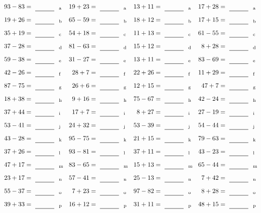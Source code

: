 \documentclass
[
  draft    = true,
  fontsize = 11pt,
  parskip  = half-
]
{scrartcl}
\begin{document}
\clearpage
\begin{align*}
    \pline{93-83}&=\rline{a}
  & \pline{19+23}&=\rline{a}
  & \pline{13+11}&=\rline{a}
  & \pline{17+28}&=\rline{a} \\[1ex]
    \pline{19+26}&=\rline{b}
  & \pline{65-59}&=\rline{b}
  & \pline{18+12}&=\rline{b}
  & \pline{17+15}&=\rline{b} \\[1ex]
    \pline{35+19}&=\rline{c}
  & \pline{54+18}&=\rline{c}
  & \pline{11+13}&=\rline{c}
  & \pline{61-55}&=\rline{c} \\[1ex]
    \pline{37-28}&=\rline{d}
  & \pline{81-63}&=\rline{d}
  & \pline{15+12}&=\rline{d}
  & \pline{8+28}&=\rline{d} \\[1ex]
    \pline{59-38}&=\rline{e}
  & \pline{31-27}&=\rline{e}
  & \pline{13+11}&=\rline{e}
  & \pline{83-69}&=\rline{e} \\[1ex]
    \pline{42-26}&=\rline{f}
  & \pline{28+7}&=\rline{f}
  & \pline{22+26}&=\rline{f}
  & \pline{11+29}&=\rline{f} \\[1ex]
    \pline{87-75}&=\rline{g}
  & \pline{26+6}&=\rline{g}
  & \pline{12+15}&=\rline{g}
  & \pline{47+7}&=\rline{g} \\[1ex]
    \pline{18+38}&=\rline{h}
  & \pline{9+16}&=\rline{h}
  & \pline{75-67}&=\rline{h}
  & \pline{42-24}&=\rline{h} \\[1ex]
    \pline{37+44}&=\rline{i}
  & \pline{17+7}&=\rline{i}
  & \pline{8+27}&=\rline{i}
  & \pline{27-19}&=\rline{i} \\[1ex]
    \pline{53-41}&=\rline{j}
  & \pline{24+32}&=\rline{j}
  & \pline{53-39}&=\rline{j}
  & \pline{54-44}&=\rline{j} \\[1ex]
    \pline{43-28}&=\rline{k}
  & \pline{95-75}&=\rline{k}
  & \pline{21+15}&=\rline{k}
  & \pline{79-63}&=\rline{k} \\[1ex]
    \pline{37+26}&=\rline{l}
  & \pline{93-81}&=\rline{l}
  & \pline{37+11}&=\rline{l}
  & \pline{43-23}&=\rline{l} \\[1ex]
    \pline{47+17}&=\rline{m}
  & \pline{83-65}&=\rline{m}
  & \pline{15+13}&=\rline{m}
  & \pline{65-44}&=\rline{m} \\[1ex]
    \pline{23+17}&=\rline{n}
  & \pline{57-41}&=\rline{n}
  & \pline{25-13}&=\rline{n}
  & \pline{7+42}&=\rline{n} \\[1ex]
    \pline{55-37}&=\rline{o}
  & \pline{7+23}&=\rline{o}
  & \pline{97-82}&=\rline{o}
  & \pline{8+28}&=\rline{o} \\[1ex]
    \pline{39+33}&=\rline{p}
  & \pline{16+12}&=\rline{p}
  & \pline{31+11}&=\rline{p}
  & \pline{48+15}&=\rline{p}
\end{align*}
\end{document}
